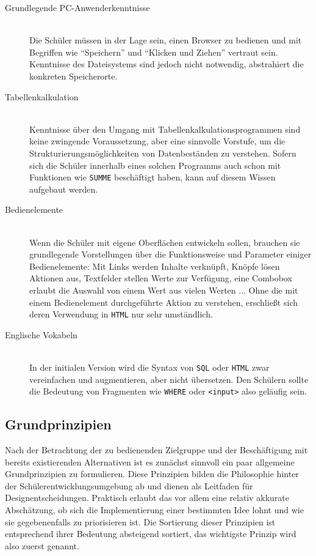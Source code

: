 \begin{description}
\item[Grundlegende PC-Anwenderkenntnisse] \hfill\\
  Die Schüler müssen in der Lage sein, einen Browser zu bedienen und mit Begriffen wie "`Speichern"' und "`Klicken und Ziehen"' vertraut sein. Kenntnisse des Dateisystems sind jedoch nicht notwendig, \idename{} abstrahiert die konkreten Speicherorte.
\item[Tabellenkalkulation] \hfill\\
  Kenntnisse über den Umgang mit Tabellenkalkulationsprogrammen sind keine zwingende Voraussetzung, aber eine sinnvolle Vorstufe, um die Strukturierungsmöglichkeiten von Datenbeständen zu verstehen. Sofern sich die Schüler innerhalb eines solchen Programms auch schon mit Funktionen wie \texttt{SUMME} beschäftigt haben, kann auf diesem Wissen aufgebaut werden.
\item[Bedienelemente] \hfill\\
  Wenn die Schüler mit \idename{} eigene Oberflächen entwickeln sollen, brauchen sie grundlegende Vorstellungen über die Funktionsweise und Parameter einiger Bedienelemente: Mit Links werden Inhalte verknüpft, Knöpfe lösen Aktionen aus, Textfelder stellen Werte zur Verfügung, eine Combobox erlaubt die Auswahl von einem Wert aus vielen Werten ... Ohne die mit einem Bedienelement durchgeführte Aktion zu verstehen, erschließt sich deren Verwendung in \texttt{HTML} nur sehr umständlich.
\item[Englische Vokabeln] \hfill\\
  In der initialen Version wird \idename{} die Syntax von \texttt{SQL} oder \texttt{HTML} zwar vereinfachen und augmentieren, aber nicht übersetzen. Den Schülern sollte die Bedeutung von Fragmenten wie \texttt{WHERE} oder \texttt{<input>} also geläufig sein.
\end{description}

\subsection{Grundprinzipien}
\label{sec:principles}

Nach der Betrachtung der zu bedienenden Zielgruppe und der Beschäftigung mit bereits existierenden Alternativen ist es zunächst sinnvoll ein paar allgemeine Grundprinzipien zu formulieren. Diese Prinzipien bilden die Philosophie hinter der Schülerentwicklungsumgebung ab und dienen als Leitfaden für Designentscheidungen. Praktisch erlaubt das vor allem eine relativ akkurate Abschätzung, ob sich die Implementierung einer bestimmten Idee lohnt und wie sie gegebenenfalls zu priorisieren ist. Die Sortierung dieser Prinzipien ist entsprechend ihrer Bedeutung absteigend sortiert, das wichtigste Prinzip wird also zuerst genannt.

